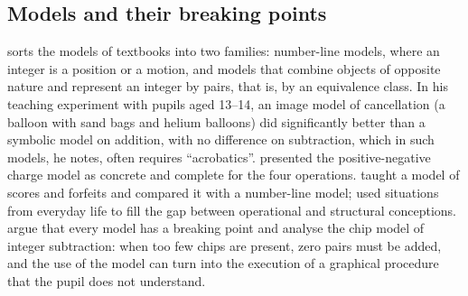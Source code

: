 \documentclass[11pt,a4paper]{article}
\theoremstyle{definition}
\begin{document}
\subsection{Models and their breaking points}
\citet{Janvier1985} sorts the models of textbooks into two families: number-line models, where an integer is a position or a motion, and models that combine objects of opposite nature and represent an integer by pairs, that is, by an equivalence class. In his teaching experiment with pupils aged 13--14, an image model of cancellation (a balloon with sand bags and helium balloons) did significantly better than a symbolic model on addition, with no difference on subtraction, which in such models, he notes, often requires ``acrobatics''. \citet{Battista1983} presented the positive-negative charge model as concrete and complete for the four operations. \citet{Liebeck1990} taught a model of scores and forfeits and compared it with a number-line model; \citet{LinchevskiWilliams1999} used situations from everyday life to fill the gap between operational and structural conceptions. \citet{Vig2014} argue that every model has a breaking point and analyse the chip model of integer subtraction: when too few chips are present, zero pairs must be added, and the use of the model can turn into the execution of a graphical procedure that the pupil does not understand.
\end{document}
